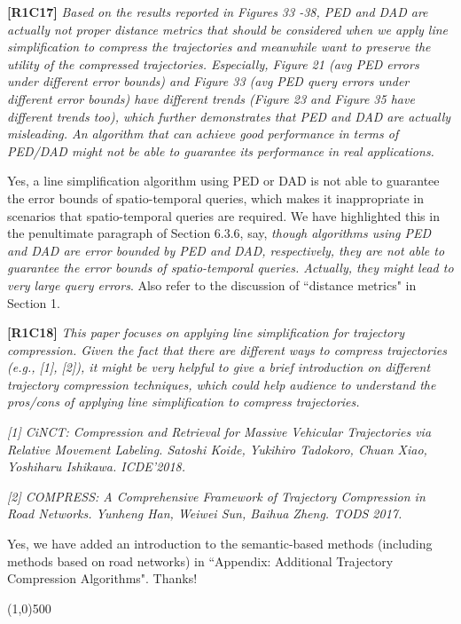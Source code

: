 \documentclass{letter}
\begin{document}
{\textbf{[R1C17]} \emph{ Based on the results reported in Figures 33 -38, PED and DAD are actually not proper distance metrics that should be considered when we apply line simplification to compress the trajectories and meanwhile want to preserve the utility of the compressed trajectories. Especially, Figure 21 (avg PED errors under different error bounds) and Figure 33 (avg PED query errors under different error bounds) have different trends (Figure 23 and Figure 35 have different trends too), which further demonstrates that PED and DAD are actually misleading. An algorithm that can achieve good performance in terms of PED/DAD might not be able to guarantee its performance in real applications. }

Yes, a line simplification algorithm using PED or DAD is not able to guarantee the error bounds of spatio-temporal queries, which makes it inappropriate in scenarios that spatio-temporal queries are required. We have highlighted this in the penultimate paragraph of Section 6.3.6, say, \emph{though algorithms using PED and DAD are error bounded by PED and DAD, respectively, they are not able to guarantee the error bounds of spatio-temporal queries. Actually, they might lead to very large query errors}. Also refer to the discussion of ``distance metrics" in Section 1. 

\textbf{[R1C18]} \emph{ This paper focuses on applying line simplification for trajectory compression. Given the fact that there are different ways to compress trajectories (e.g., [1], [2]), it might be very helpful to give a brief introduction on different trajectory compression techniques, which could help audience to understand the pros/cons of applying line simplification to compress trajectories. }

\emph{ [1] CiNCT: Compression and Retrieval for Massive Vehicular Trajectories via Relative Movement Labeling. Satoshi Koide, Yukihiro Tadokoro, Chuan Xiao, Yoshiharu Ishikawa. ICDE'2018.}

\emph{ [2] COMPRESS: A Comprehensive Framework of Trajectory Compression in Road Networks. Yunheng Han, Weiwei Sun, Baihua Zheng. TODS 2017.}


{Yes, we have added an introduction to the semantic-based methods (including methods based on road networks) in ``Appendix: Additional Trajectory Compression Algorithms". Thanks!} 

\line(1,0){500}

}
\end{document}
